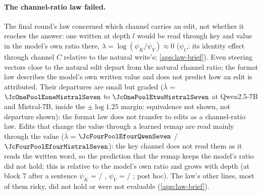 \paragraph{The channel-ratio law failed.}
The final round's law concerned which channel carries an edit, not whether it reaches the answer: one written at depth $l$ would be read through key and value in the model's own ratio there, $\lambda = \log(\psi_K/\psi_V) \approx 0$ ($\psi_C$: its identity effect through channel $C$ relative to the natural write's; \cref{app:law-brief}). Even steering vectors close to the natural edit depart from the natural channel ratio; the format law describes the model's own written value and does not predict how an edit is attributed. %
Their departures are small but graded ($\bar\lambda$ = $\JcOnePoolEoneMistralSeven$ to $\JcOnePoolEtwoMistralSeven$ at Qwen2.5-7B and Mistral-7B, inside the $\pm\log 1.25$ margin: equivalence not shown, not departure shown): the format law does not transfer to edits as a channel-ratio law. Edits that change the value through a learned remap are read mainly through the value ($\bar\lambda$ = $\JcFourPoolEfourQwenSeven$ / $\JcFourPoolEfourMistralSeven$): the key channel does not read them as it reads the written word, so the prediction\rsk{} that the remap keeps the model's ratio did not hold; this is relative to the model's own ratio and grows with depth (at block 7 after a sentence $\psi_K$ = \JcFourPsiKWpostSevenQwenSeven{} / \JcFourPsiKWpostSevenMistralSeven{}, $\psi_V$ = \JcFourPsiVWpostSevenQwenSeven{} / \JcFourPsiVWpostSevenMistralSeven{}; post hoc). The law's other lines, most of them risky, did not hold or were not evaluable (\cref{app:law-brief}).
